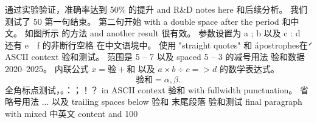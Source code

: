 \documentclass{article}
\begin{document}
通过实验验证，准确率达到 50\% 的提升 and R\&D notes here 和后续分析。
我们测试了 50%
第一句结束。  第二句开始 with a double space after the period 和中文。
如图所示 \cite{zhang2024} 的方法 and another result \cite{li2025} 很有效。
参数设置为 a ; b 以及 c : d 还有 e~~f 的非断行空格 在中文语境中。
使用 "straight quotes" 和 \'apostrophes\' 在 ASCII context 验和测试。
范围是 5 -- 7 以及 spaced 5 – 3 的减号用法 验和数据 2020–2025。
内联公式 $x = 验 + 和$ 以及 $a \times b \div c => d$ 的数学表达式。
\begin{equation} 验和 = \alpha , \beta . \end{equation}
全角标点测试，。：；！？ in ASCII context 验和 with fullwidth punctuation。
省略号用法 ... 以及 trailing spaces below 验和   
末尾段落 验和测试 final paragraph with mixed 中英文 content and 100%
\end{document}
